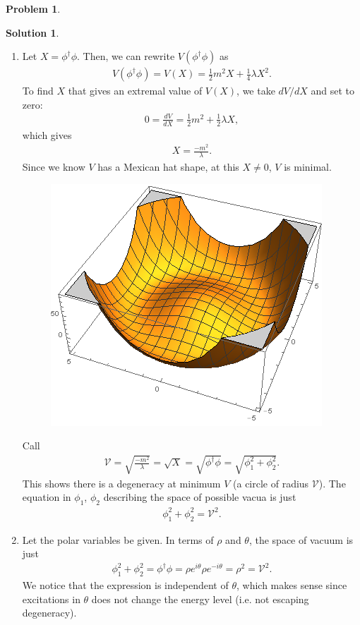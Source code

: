 \documentclass[a4paper,11pt]{article}
\numberwithin{equation}{section}
\theoremstyle{definition}
\newtheorem{prob}{Problem}[section]
\newtheorem{sln}{Solution}[section]
\newcommand{\V}{\mathcal{V}}
\begin{document}
\begin{prob}
\begin{sln}
\begin{enumerate}
			
			
			
			\item  Let $X = \phi^\dagger\phi$. Then, we can rewrite $V(\phi^\dagger\phi)$ as
			\begin{align}
			V(\phi^\dagger\phi) = V(X) = \frac{1}{2}m^2X + \frac{1}{4}\lambda X^2.
			\end{align}
			To find $X$ that gives an extremal value of $V(X)$, we take $dV/dX$ and set to zero:
			\begin{align}
			0 = \frac{dV}{dX} = \frac{1}{2}m^2 + \frac{1}{2}\lambda X,
			\end{align}
			which gives
			\begin{align}
			X = \frac{-m^2}{\lambda}.
			\end{align}
			Since we know $V$ has a Mexican hat shape, at this $X\neq 0$, $V$ is minimal. 
			\begin{figure}[h!]
				\centering
				\includegraphics[scale=1]{hat.png}
			\end{figure}
			
			
			Call
			\begin{align}
			\V = \sqrt{\frac{-m^2}{\lambda}} = \sqrt{X} = \sqrt{\phi^\dagger\phi} = \sqrt{\phi_1^2 + \phi_2^2}.
			\end{align}
			This shows there is a degeneracy at minimum $V$ (a circle of radius $\V$). The equation in $\phi_1$, $\phi_2$ describing the space of possible vacua is just
			\begin{align}
			\phi_1^2 + \phi_2^2 = \V^2.
			\end{align}
			
			
			
			
			\item Let the polar variables be given. In terms of $\rho$ and $\theta$, the space of vacuum is just
			\begin{align}
			\phi_1^2 + \phi_2^2 = \phi^\dagger\phi = \rho e^{i\theta}\rho e^{-i\theta} = \rho^2 = \V^2.
			\end{align}
			We notice that the expression is independent of $\theta$, which makes sense since excitations in $\theta$ does not change the energy level (i.e. not escaping degeneracy).
			

\end{enumerate}
\end{sln}
\end{prob}
\end{document}
